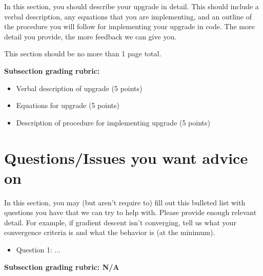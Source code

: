 \documentclass[12pt]{article}
\begin{document}
In this section, you should describe your upgrade in detail.  This should include a verbal description, any equations that you are implementing, and an outline of the procedure you will follow for implementing your upgrade in code.  The more detail you provide, the more feedback we can give you.

This section should be no more than 1 page total. 

\textbf{Subsection grading rubric:}
\begin{itemize}
	\item Verbal description of upgrade (5 points)
	\item Equations for upgrade (5 points)
	\item Description of procedure for implementing upgrade (5 points)
\end{itemize}

\section{Questions/Issues you want advice on}

In this section, you may (but aren't require to) fill out this bulleted list with questions you have that we can try to help with.  Please provide enough relevant detail.  For example, if gradient descent isn't converging, tell us what your convergence criteria is and what the behavior is (at the minimum).

\begin{itemize}
	\item Question 1: ...
\end{itemize}

\textbf{Subsection grading rubric: N/A}
\end{document}
